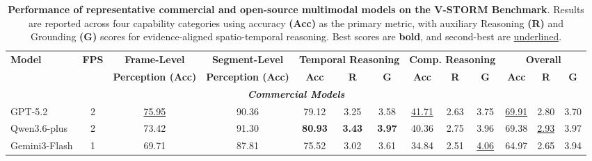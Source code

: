 \documentclass[letterpaper]{article} %
\begin{document}
\begin{table}[!t] 
\centering
\small
\caption{\textbf{Performance of representative commercial and open-source multimodal models on the V-STORM Benchmark}. Results are reported across four capability categories using accuracy \textbf{(Acc)} as the primary metric, with auxiliary Reasoning \textbf{(R)} and Grounding \textbf{(G)} scores for evidence-aligned spatio-temporal reasoning. Best scores are \textbf{bold}, and second-best are \underline{underlined}.}
\label{tab:main_results}

\setlength{\tabcolsep}{1mm}
\renewcommand{\arraystretch}{1.0}

\begin{tabular}{l c c c c c c c c c c c c}
\toprule
\textbf{Model} & \textbf{FPS} & 
\textbf{Frame-Level} & 
\textbf{Segment-Level} & 
\multicolumn{3}{c}{\textbf{Temporal Reasoning}} & 
\multicolumn{3}{c}{\textbf{Comp. Reasoning}} & 
\multicolumn{3}{c}{\textbf{Overall}} \\

\cmidrule(lr){5-7} \cmidrule(lr){8-10} \cmidrule(lr){11-13}
& & \textbf{Perception (Acc)} & \textbf{Perception (Acc)} & \textbf{Acc} & \textbf{R} & \textbf{G} & \textbf{Acc} & \textbf{R} & \textbf{G} & \textbf{Acc} & \textbf{R} & \textbf{G} \\
\midrule

 
\multicolumn{13}{c}{\textit{\textbf{Commercial Models}}} \\ 
\midrule

    GPT-5.2        & 2 & \underline{75.95} & 90.36 & 79.12 & 3.25 & 3.58 & \underline{41.71} & 2.63 & 3.75 & \underline{69.91} & 2.80 & 3.70 \\
Qwen3.6-plus    & 2 & 73.42 & 91.30 & \textbf{80.93} & \textbf{3.43} & \textbf{3.97} & 40.36 & 2.75 & 3.96 & 69.38 & \underline{2.93} & 3.97 \\
Gemini3-Flash    & 1 & 69.71 & 87.81 & 75.52 & 3.02 & 3.61 & 34.84 & 2.51 & \underline{4.06} & 64.97 & 2.65 & 3.94 \\
\midrule



\end{tabular}
\end{table}
\end{document}
